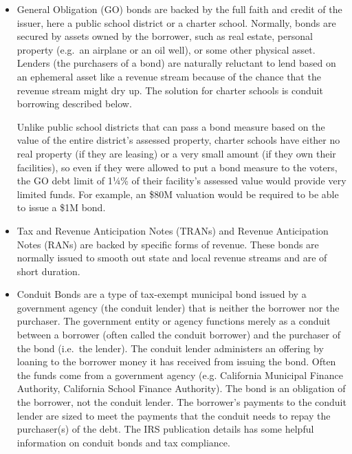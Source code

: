 \begin{itemize}
  \item General Obligation (GO) bonds are backed by the full faith and credit of the issuer, here a public school district or a charter school. Normally, bonds are secured by assets owned by the borrower, such as real estate, personal property (e.g.\ an airplane or an oil well), or some other physical asset. Lenders (the purchasers of a bond) are naturally reluctant to lend based on an ephemeral asset like a revenue stream because of the chance that the revenue stream might dry up. The solution for charter schools is conduit borrowing described below.

  Unlike public school districts that can pass a bond measure based on the value of the entire district's assessed property, charter schools have either no real property (if they are leasing) or a very small amount (if they own their facilities), so even if they were allowed to put a bond measure to the voters, the GO debt limit of 1¼\% of their facility's assessed value would provide very limited funds. For example, an \$80M valuation would be required to be able to issue a \$1M bond. 

  \item Tax and Revenue Anticipation Notes (TRANs) and Revenue Anticipation Notes (RANs) are backed by specific forms of revenue. These bonds are normally issued to smooth out state and local revenue streams and are of short duration.
  
  \item Conduit Bonds are a type of tax-exempt municipal bond issued by  a government agency (the conduit lender) that is neither the borrower nor the purchaser. The government entity or agency functions merely as a conduit between a borrower (often called the conduit borrower) and the purchaser of the bond (i.e.\ the lender). The conduit lender administers an offering by loaning to the borrower money it has received from issuing the bond. Often the funds come from a government agency (e.g. California Municipal Finance Authority, California School Finance Authority). The bond is an obligation of the borrower, not the conduit lender. The borrower's payments to the conduit lender are sized to meet the payments that the conduit needs to repay the purchaser(s) of the debt. The IRS publication  details has some helpful information on conduit bonds and tax compliance.

\begin{comment}
  For example, in 2014, the California Municipal Finance Authority issued bonds (2014A:tax-exempt and 2014B:taxable) for \$32,915,000. These bonds were bought by Approved Institutional Buyers, and the proceeds were loaned to Launchpad Development Company which used them for public benefit. The borrower is Launchpad Development Company, and the conduit borrower is the California Municipal Finance Authority.
\end{comment}
\end{itemize}

